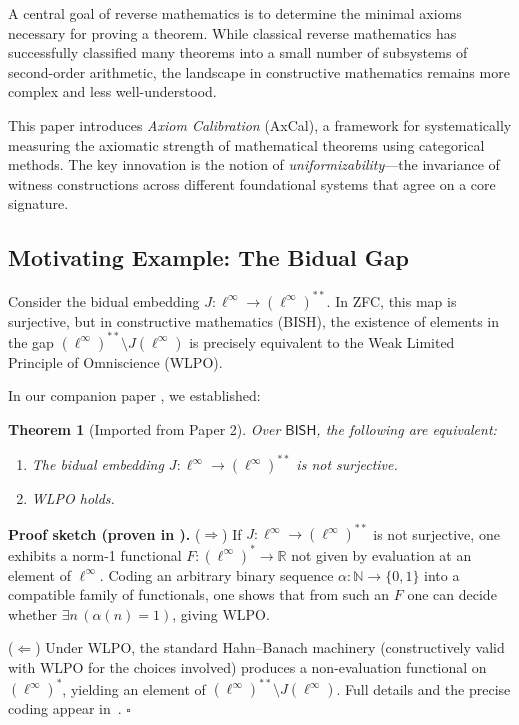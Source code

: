 \documentclass[11pt]{article}
\newtheorem{theorem}{Theorem}[section]
\newenvironment{proof}[1][Proof]{\noindent\textbf{#1.}\hspace{0.5em}}{\hfill$\square$\par}
\newcommand{\N}{\mathbb{N}}
\newcommand{\R}{\mathbb{R}}
\newcommand{\BISH}{\mathsf{BISH}}
\newcommand{\linf}{\ell^\infty}
\begin{document}
A central goal of reverse mathematics is to determine the minimal axioms necessary for proving a theorem. While classical reverse mathematics has successfully classified many theorems into a small number of subsystems of second-order arithmetic, the landscape in constructive mathematics remains more complex and less well-understood.

This paper introduces \emph{Axiom Calibration} (AxCal), a framework for systematically measuring the axiomatic strength of mathematical theorems using categorical methods. The key innovation is the notion of \emph{uniformizability}—the invariance of witness constructions across different foundational systems that agree on a core signature.

\subsection{Motivating Example: The Bidual Gap}

Consider the bidual embedding $J: \linf \to (\linf)^{**}$. In ZFC, this map is surjective, but in constructive mathematics (BISH), the existence of elements in the gap $(\linf)^{**} \setminus J(\linf)$ is precisely equivalent to the Weak Limited Principle of Omniscience (WLPO).

In our companion paper \cite{Paper2}, we established:

\begin{theorem}[Imported from Paper 2]\label{thm:paper2}
Over $\BISH$, the following are equivalent:
\begin{enumerate}
\item The bidual embedding $J: \linf \to (\linf)^{**}$ is not surjective.
\item WLPO holds.
\end{enumerate}
\end{theorem}

\begin{proof}[Proof sketch (proven in \cite{Paper2})]
($\Rightarrow$) If $J:\linf\to(\linf)^{**}$ is not surjective, one exhibits a norm-1 functional
$F:(\linf)^{*}\to\R$ not given by evaluation at an element of $\linf$. Coding an arbitrary binary
sequence $\alpha:\N\to\{0,1\}$ into a compatible family of functionals, one shows that from such an
$F$ one can decide whether $\exists n\,(\alpha(n)=1)$, giving WLPO.

($\Leftarrow$) Under WLPO, the standard Hahn--Banach machinery (constructively valid with WLPO for
the choices involved) produces a non-evaluation functional on $(\linf)^{*}$, yielding an element of
$(\linf)^{**}\setminus J(\linf)$. Full details and the precise coding appear in~\cite{Paper2}.
\end{proof}
\end{document}

